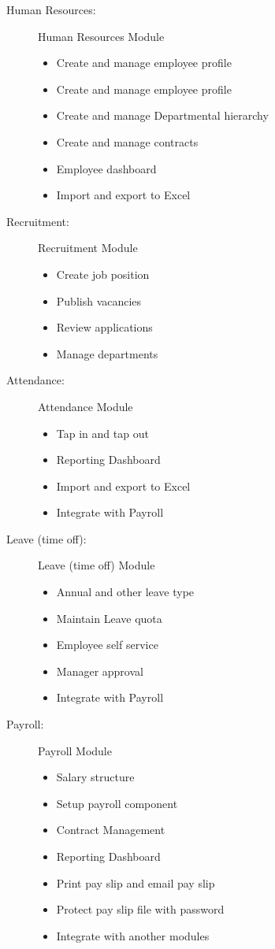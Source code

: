 \begin{description}
	\item[Human Resources:] Human Resources Module
	\begin{itemize}
		\item Create and manage employee profile
 		\item Create and manage employee profile
 		\item Create and manage Departmental hierarchy
 		\item Create and manage contracts
 		\item Employee dashboard
 		\item Import and export to Excel
 	\end{itemize}
 	
 	\item[Recruitment:] Recruitment Module
	\begin{itemize}
		\item Create job position
		\item Publish vacancies
		\item Review applications
		\item Manage departments
 	\end{itemize}
 	
 	\item[Attendance:] Attendance Module
	\begin{itemize}
		\item Tap in and tap out
		\item Reporting Dashboard
		\item Import and export to Excel
		\item Integrate with Payroll
 	\end{itemize}
 	
 	\item[Leave (time off):] Leave (time off) Module
	\begin{itemize}
		\item Annual and other leave type
		\item Maintain Leave quota
		\item Employee self service
		\item Manager approval
		\item Integrate with Payroll
 	\end{itemize}
 	
 	\item[Payroll:] Payroll Module
	\begin{itemize}
		\item Salary structure
		\item Setup payroll component 
		\item Contract Management
		\item Reporting Dashboard 
		\item Print pay slip and email pay slip
		\item Protect pay slip file with password
		\item Integrate with another modules
 	\end{itemize}
 	

\end{description}
